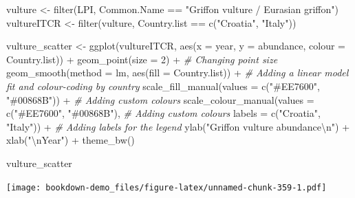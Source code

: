 \documentclass[
]{book}
\newenvironment{Shaded}{\begin{snugshade}}{\end{snugshade}}
\newcommand{\AttributeTok}[1]{\textcolor[rgb]{0.77,0.63,0.00}{#1}}
\newcommand{\CommentTok}[1]{\textcolor[rgb]{0.56,0.35,0.01}{\textit{#1}}}
\newcommand{\DecValTok}[1]{\textcolor[rgb]{0.00,0.00,0.81}{#1}}
\newcommand{\FunctionTok}[1]{\textcolor[rgb]{0.00,0.00,0.00}{#1}}
\newcommand{\NormalTok}[1]{#1}
\newcommand{\OtherTok}[1]{\textcolor[rgb]{0.56,0.35,0.01}{#1}}
\newcommand{\SpecialCharTok}[1]{\textcolor[rgb]{0.00,0.00,0.00}{#1}}
\newcommand{\StringTok}[1]{\textcolor[rgb]{0.31,0.60,0.02}{#1}}
\begin{document}
\begin{Shaded}
\begin{Highlighting}[]
\NormalTok{vulture }\OtherTok{\textless{}{-}} \FunctionTok{filter}\NormalTok{(LPI, Common.Name }\SpecialCharTok{==} \StringTok{"Griffon vulture / Eurasian griffon"}\NormalTok{)}
\NormalTok{vultureITCR }\OtherTok{\textless{}{-}} \FunctionTok{filter}\NormalTok{(vulture, Country.list }\SpecialCharTok{==} \FunctionTok{c}\NormalTok{(}\StringTok{"Croatia"}\NormalTok{, }\StringTok{"Italy"}\NormalTok{))}

\NormalTok{vulture\_scatter }\OtherTok{\textless{}{-}} \FunctionTok{ggplot}\NormalTok{(vultureITCR, }\FunctionTok{aes}\NormalTok{(}\AttributeTok{x =}\NormalTok{ year, }\AttributeTok{y =}\NormalTok{ abundance, }\AttributeTok{colour =}\NormalTok{ Country.list)) }\SpecialCharTok{+}
    \FunctionTok{geom\_point}\NormalTok{(}\AttributeTok{size =} \DecValTok{2}\NormalTok{) }\SpecialCharTok{+}                                              \CommentTok{\# Changing point size}
    \FunctionTok{geom\_smooth}\NormalTok{(}\AttributeTok{method =}\NormalTok{ lm, }\FunctionTok{aes}\NormalTok{(}\AttributeTok{fill =}\NormalTok{ Country.list)) }\SpecialCharTok{+}                \CommentTok{\# Adding a linear model fit and colour{-}coding by country}
    \FunctionTok{scale\_fill\_manual}\NormalTok{(}\AttributeTok{values =} \FunctionTok{c}\NormalTok{(}\StringTok{"\#EE7600"}\NormalTok{, }\StringTok{"\#00868B"}\NormalTok{)) }\SpecialCharTok{+}               \CommentTok{\# Adding custom colours}
    \FunctionTok{scale\_colour\_manual}\NormalTok{(}\AttributeTok{values =} \FunctionTok{c}\NormalTok{(}\StringTok{"\#EE7600"}\NormalTok{, }\StringTok{"\#00868B"}\NormalTok{),               }\CommentTok{\# Adding custom colours}
                        \AttributeTok{labels =} \FunctionTok{c}\NormalTok{(}\StringTok{"Croatia"}\NormalTok{, }\StringTok{"Italy"}\NormalTok{)) }\SpecialCharTok{+}               \CommentTok{\# Adding labels for the legend}
    \FunctionTok{ylab}\NormalTok{(}\StringTok{"Griffon vulture abundance}\SpecialCharTok{\textbackslash{}n}\StringTok{"}\NormalTok{) }\SpecialCharTok{+}                             
    \FunctionTok{xlab}\NormalTok{(}\StringTok{"}\SpecialCharTok{\textbackslash{}n}\StringTok{Year"}\NormalTok{)  }\SpecialCharTok{+}
        \FunctionTok{theme\_bw}\NormalTok{() }

\NormalTok{vulture\_scatter}
\end{Highlighting}
\end{Shaded}

\texttt{[image: bookdown-demo\_files/figure-latex/unnamed-chunk-359-1.pdf]}
\end{document}
